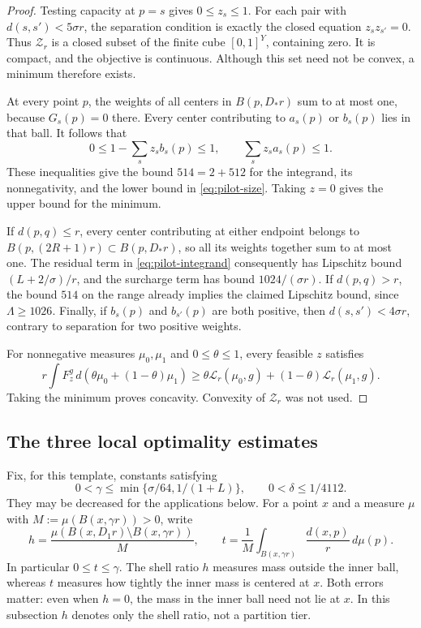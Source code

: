 \begin{proof}
Testing capacity at $p=s$ gives $0\le z_s\le1$.  For each pair with
$d(s,s')<5\sigma r$, the separation condition is exactly the closed
equation $z_sz_{s'}=0$.  Thus $\mathcal Z_r$ is a closed subset of the
finite cube $[0,1]^Y$, containing zero.  It is compact, and the objective
is continuous.  Although this set need not be convex, a minimum therefore
exists.

At every point $p$, the weights of all centers in $B(p,D_*r)$ sum to at
most one, because $G_s(p)=0$ there.  Every center contributing to $a_s(p)$
or $b_s(p)$ lies in that ball.  It follows that
\[
 0\le1-\sum_s z_sb_s(p)\le1,
 \qquad \sum_s z_sa_s(p)\le1.
\]
These inequalities give the bound $514=2+512$ for the integrand, its
nonnegativity, and the lower bound in \eqref{eq:pilot-size}.  Taking
$z=0$ gives the upper bound for the minimum.

If $d(p,q)\le r$, every center contributing at either endpoint belongs
to $B(p,(2R+1)r)\subset B(p,D_*r)$, so all its weights together sum to
at most one.  The residual term in \eqref{eq:pilot-integrand} consequently
has Lipschitz bound $(L+2/\sigma)/r$, and the surcharge term has bound
$1024/(\sigma r)$.  If $d(p,q)>r$, the bound $514$ on the range already
implies the claimed Lipschitz bound, since $\Lambda\ge1026$.  Finally,
if $b_s(p)$ and $b_{s'}(p)$ are both positive, then
$d(s,s')<4\sigma r$, contrary to separation for two positive weights.

For nonnegative measures $\mu_0,\mu_1$ and $0\le\theta\le1$, every
feasible $z$ satisfies
\[
 r\int F_z^g\,d(\theta\mu_0+(1-\theta)\mu_1)
 \ge\theta\mathcal L_r(\mu_0,g)
       +(1-\theta)\mathcal L_r(\mu_1,g).
\]
Taking the minimum proves concavity.  Convexity of $\mathcal Z_r$ was
not used.
\end{proof}

\subsection{The three local optimality estimates}

Fix, for this template, constants satisfying
\begin{equation}
 0<\gamma\le\min\{\sigma/64,1/(1+L)\},
 \qquad 0<\delta\le1/4112.
 \label{eq:pilot-concentration-constants}
\end{equation}
They may be decreased for the applications below.  For a point $x$ and
a measure $\mu$ with $M:=\mu(B(x,\gamma r))>0$, write
\begin{equation}
 h=\frac{\mu(B(x,D_1r)\setminus B(x,\gamma r))}{M},
 \qquad
 t=\frac1M\int_{B(x,\gamma r)}\frac{d(x,p)}r\,d\mu(p).
 \label{eq:pilot-shell-moment}
\end{equation}
In particular $0\le t\le\gamma$.  The shell ratio $h$ measures mass
outside the inner ball, whereas $t$ measures how tightly the inner mass
is centered at $x$.  Both errors matter: even when $h=0$, the mass in
the inner ball need not lie at $x$.  In this subsection $h$ denotes only
the shell ratio, not a partition tier.

